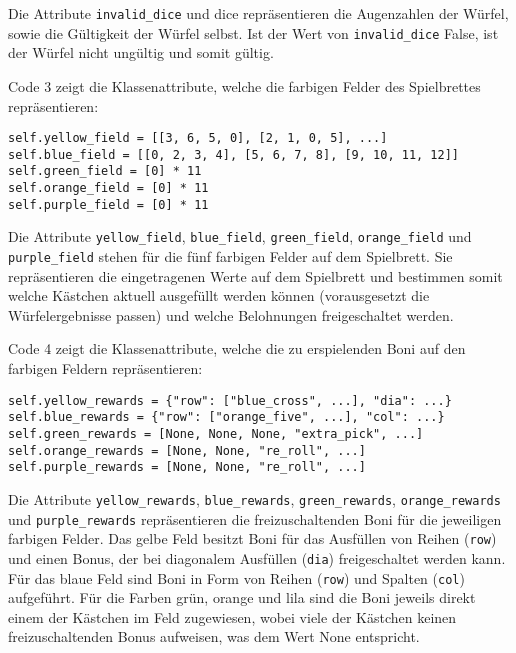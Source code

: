 Die Attribute \texttt{invalid\_dice} und dice repräsentieren die Augenzahlen der Würfel, sowie die Gültigkeit der Würfel selbst. Ist der Wert von \texttt{invalid\_dice} False, ist der Würfel nicht ungültig und somit gültig.\\

\begin{minipage}{\linewidth}
Code 3 zeigt die Klassenattribute, welche die farbigen Felder des Spielbrettes repräsentieren:
\vspace{0.5cm}
\begin{lstlisting}[caption={Klassenattribute für die farbigen Felder des Spiels}, basicstyle=\ttfamily]
self.yellow_field = [[3, 6, 5, 0], [2, 1, 0, 5], ...]
self.blue_field = [[0, 2, 3, 4], [5, 6, 7, 8], [9, 10, 11, 12]]
self.green_field = [0] * 11
self.orange_field = [0] * 11
self.purple_field = [0] * 11
\end{lstlisting}
\end{minipage}

Die Attribute \texttt{yellow\_field}, \texttt{blue\_field}, \texttt{green\_field}, \texttt{orange\_field} und \texttt{purple\_field} stehen für die fünf farbigen Felder auf dem Spielbrett. Sie repräsentieren die eingetragenen Werte auf dem Spielbrett und bestimmen somit welche Kästchen aktuell ausgefüllt werden können (vorausgesetzt die Würfelergebnisse passen) und welche Belohnungen freigeschaltet werden.\\

\newpage
\begin{minipage}{\linewidth}
Code 4 zeigt die Klassenattribute, welche die zu erspielenden Boni auf den farbigen Feldern repräsentieren:
\vspace{0.5cm}
\begin{lstlisting}[caption={Klassenattribute für freizuschaltende Boni}, basicstyle=\ttfamily]
self.yellow_rewards = {"row": ["blue_cross", ...], "dia": ...}
self.blue_rewards = {"row": ["orange_five", ...], "col": ...}
self.green_rewards = [None, None, None, "extra_pick", ...]
self.orange_rewards = [None, None, "re_roll", ...]
self.purple_rewards = [None, None, "re_roll", ...]
\end{lstlisting}
\end{minipage}

Die Attribute \texttt{yellow\_rewards}, \texttt{blue\_rewards}, \texttt{green\_rewards}, \texttt{orange\_rewards} und \texttt{purple\_rewards} repräsentieren die freizuschaltenden Boni für die jeweiligen farbigen Felder. Das gelbe Feld besitzt Boni für das Ausfüllen von Reihen (\texttt{row}) und einen Bonus, der bei diagonalem Ausfüllen (\texttt{dia}) freigeschaltet werden kann. Für das blaue Feld sind Boni in Form von Reihen (\texttt{row}) und Spalten (\texttt{col}) aufgeführt. Für die Farben grün, orange und lila sind die Boni jeweils direkt einem der Kästchen im Feld zugewiesen, wobei viele der Kästchen keinen freizuschaltenden Bonus aufweisen, was dem Wert None entspricht.\\

